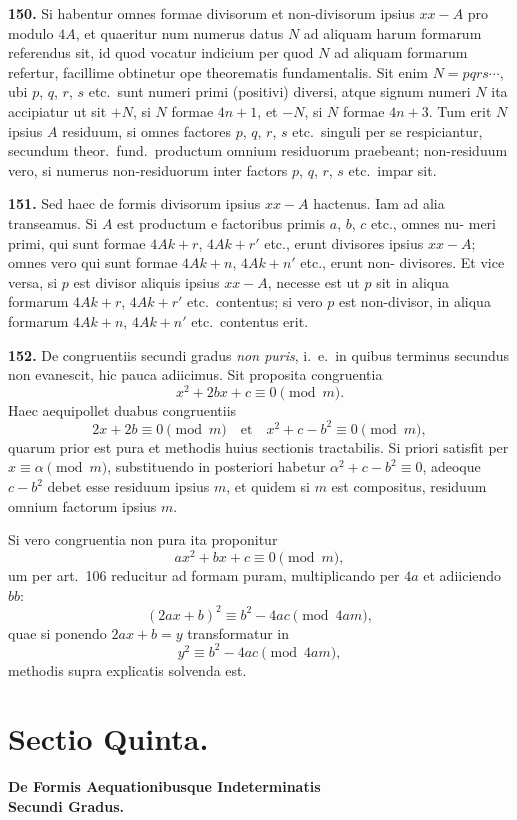 \documentclass[12pt,a4paper]{article}
\begin{document}
\textbf{150.}
Si habentur omnes formae divisorum et non-divisorum ipsius
$xx - A$ pro modulo $4A$, et quaeritur num numerus datus $N$ ad aliquam harum
formarum referendus sit, id quod vocatur indicium per quod $N$ ad aliquam
formarum refertur, facillime obtinetur ope theorematis fundamentalis. Sit enim
$N = pqrs\cdots$, ubi $p$, $q$, $r$, $s$ etc.\ sunt numeri primi (positivi) diversi, atque
signum numeri $N$ ita accipiatur ut sit $+N$, si $N$ formae $4n+1$, et $-N$,
si $N$ formae $4n+3$. Tum erit $N$ ipsius $A$ residuum, si omnes factores
$p$, $q$, $r$, $s$ etc.\ singuli per se respiciantur, secundum theor.\ fund.\ productum
omnium residuorum praebeant; non-residuum vero, si numerus non-residuorum
inter factors $p$, $q$, $r$, $s$ etc.\ impar sit.

\textbf{151.}
Sed haec de formis divisorum ipsius $xx - A$ hactenus. Iam ad alia
transeamus. Si $A$ est productum e factoribus primis $a$, $b$, $c$ etc., omnes nu-
meri primi, qui sunt formae $4Ak + r$, $4Ak + r'$ etc., erunt divisores ipsius
$xx - A$; omnes vero qui sunt formae $4Ak + n$, $4Ak + n'$ etc., erunt non-
divisores. Et vice versa, si $p$ est divisor aliquis ipsius $xx - A$, necesse est ut
$p$ sit in aliqua formarum $4Ak + r$, $4Ak + r'$ etc.\ contentus; si vero $p$ est
non-divisor, in aliqua formarum $4Ak + n$, $4Ak + n'$ etc.\ contentus erit.

\textbf{152.}
De congruentiis secundi gradus \textit{non puris}, i.~e.\ in quibus terminus
secundus non evanescit, hic pauca adiicimus. Sit proposita congruentia
\[
x^2 + 2bx + c \equiv 0 \pmod{m}.
\]
Haec aequipollet duabus congruentiis
\[
2x + 2b \equiv 0 \pmod{m} \quad \text{et} \quad x^2 + c - b^2 \equiv 0 \pmod{m},
\]
quarum prior est pura et methodis huius sectionis tractabilis. Si priori satisfit
per $x \equiv \alpha \pmod{m}$, substituendo in posteriori habetur $\alpha^2 + c - b^2 \equiv 0$,
adeoque $c - b^2$ debet esse residuum ipsius $m$, et quidem si $m$ est compositus,
residuum omnium factorum ipsius $m$.

Si vero congruentia non pura ita proponitur
\[
ax^2 + bx + c \equiv 0 \pmod{m},
\]
um per art.~106 reducitur ad formam puram, multiplicando per $4a$ et adiiciendo
$bb$:
\[
(2ax + b)^2 \equiv b^2 - 4ac \pmod{4am},
\]
quae si ponendo $2ax + b = y$ transformatur in
\[
y^2 \equiv b^2 - 4ac \pmod{4am},
\]
methodis supra explicatis solvenda est.


\section*{Sectio Quinta.}
\begin{center}
\Large\textbf{De Formis Aequationibusque Indeterminatis}\\
\Large\textbf{Secundi Gradus.}
\end{center}
\end{document}
